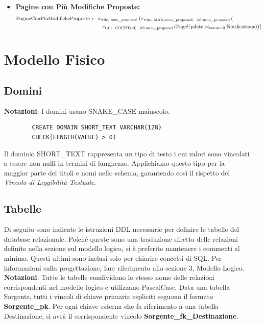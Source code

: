 \documentclass{article}
\begin{document}
\begin{itemize}
			
			\item \textbf{Pagine con Più Modifiche Proposte:}
\begin{align*}
	\text{PagineConPiuModificheProposte} &\leftarrow \pi_{\text{title, num\_proposed}} \left( \pi_{\text{title, MAX(num\_proposed) \text{ AS num\_proposed}}} \left( \right. \right. \\
	& \qquad \left. \left. \pi_{\text{title, COUNT(id) \text{ AS num\_proposed}}} \left( \text{PageUpdate} \bowtie_{\text{status=0}} \text{Notifications} \right) \right) \right)
\end{align*}


		
	\end{itemize}
	
	\newpage
	
	\section{Modello Fisico}
	\subsection{Domini}
	\textbf{Notazioni}: I domini usano SNAKE\_CASE maiuscolo.
		
	\begin{lstlisting}
		CREATE DOMAIN SHORT_TEXT VARCHAR(128)
		CHECK(LENGTH(VALUE) > 0)
	\end{lstlisting}
	
	Il dominio SHORT\_TEXT rappresenta un tipo di testo i cui valori sono vincolati
	a essere non nulli in termini di lunghezza. Applichiamo questo tipo per la maggior parte
	dei titoli e nomi nello schema, garantendo così il rispetto del {\itshape{Vincolo di Leggibilit\`a Testuale}}.
	
	\subsection{Tabelle}
	Di seguito sono indicate le istruzioni DDL necessarie per definire le
	tabelle del database relazionale. Poiché queste sono una traduzione diretta delle
	relazioni definite nella sezione sul modello logico, si è preferito mantenere i
	commenti al minimo. Questi ultimi sono inclusi solo per chiarire concetti di SQL.
	Per informazioni sulla progettazione, fare riferimento alla sezione 3, Modello Logico.
	\\
	\textbf{Notazioni}: Tutte le tabelle condividono lo stesso nome delle relazioni
	corrispondenti nel modello logico e utilizzano PascalCase. Data una
	tabella Sorgente, tutti i vincoli di chiave primaria espliciti seguono il formato
	\textbf{Sorgente\_pk}. Per ogni chiave esterna che fa riferimento a una tabella
	Destinazione, si avrà il corrispondente vincolo \textbf{Sorgente\_fk\_Destinazione}.
	
\end{document}
